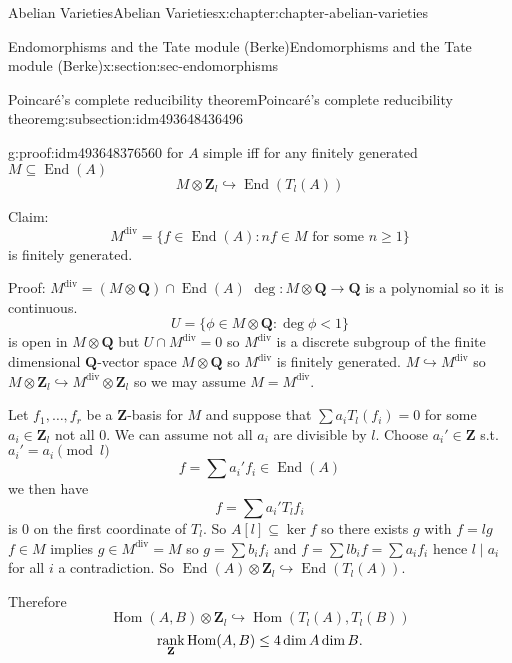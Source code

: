 \documentclass[oneside,10pt,]{book}
\newcommand{\qedhere}{\relax}
\numberwithin{equation}{section}
\newcommand{\lb}{[}
\newcommand{\rb}{]}
\newcommand{\ZZ}{\mathbf{Z}}
\newcommand{\QQ}{\mathbf{Q}}
\DeclareMathOperator{\End}{End}
\DeclareMathOperator{\Hom}{Hom}
\DeclareMathOperator{\rank}{rank}
\newcommand{\lt}{<}
\begin{document}
\begin{chapterptx}{Abelian Varieties}{}{Abelian Varieties}{}{}{x:chapter:chapter-abelian-varieties}
\begin{sectionptx}{Endomorphisms and the Tate module (Berke)}{}{Endomorphisms and the Tate module (Berke)}{}{}{x:section:sec-endomorphisms}
\begin{subsectionptx}{Poincaré's complete reducibility theorem}{}{Poincaré's complete reducibility theorem}{}{}{g:subsection:idm493648436496}
\begin{proofptx}{}{g:proof:idm493648376560}
for \(A\) simple iff for any finitely generated \(M \subseteq \End(A)\)%
\begin{equation*}
M \otimes \ZZ_l \hookrightarrow \End(T_l(A))
\end{equation*}
%
\par
Claim:%
\begin{equation*}
M^{\text{div}} = \{f\in \End(A) : nf\in M \text{ for some }n\ge 1\}
\end{equation*}
is finitely generated.%
\par
Proof: \(M^\text{div} = (M\otimes \QQ) \cap \End(A)\) \(\deg \colon M \otimes \QQ \to \QQ\) is a polynomial so it is continuous.%
\begin{equation*}
U = \{\phi\in M \otimes \QQ : \deg \phi \lt 1\}
\end{equation*}
is open in \(M \otimes \QQ\) but \(U \cap M^\text{div} = 0\) so \(M^\text{div} \) is a discrete subgroup of the finite dimensional \(\QQ\)-vector space \(M \otimes \QQ\) so \(M^\text{div}\) is finitely generated. \(M \hookrightarrow M^\text{div}\) so \(M \otimes \ZZ_l \hookrightarrow M^\text{div} \otimes \ZZ_l\) so  we may assume \(M = M^\text{div}\).%
\par
Let \(f_1,\ldots, f_r\) be a \(\ZZ\)-basis for \(M\) and suppose that \(\sum a_iT_l(f_i)=0\) for some \(a_i \in \ZZ_l\) not all 0. We can assume not all \(a_i\) are divisible by \(l\). Choose \(a_i' \in \ZZ\) s.t. \(a_i'=a_i \pmod{l}\)%
\begin{equation*}
f = \sum a_i' f_i \in \End(A)
\end{equation*}
we then have%
\begin{equation*}
f = \sum a_i' T_lf_i
\end{equation*}
is 0 on the first coordinate of \(T_l\). So \(A\lb l \rb \subseteq \ker f\) so there exists \(g\) with \(f= lg\) \(f\in M\) implies \(g\in M^\text{div} = M\) so \(g = \sum b_i f_i\) and \(f = \sum lb_i f = \sum a_i f_i\) hence \(l\mid a_i\) for all \(i\) a contradiction. So \(\End(A)\otimes \ZZ_l \hookrightarrow \End(T_l(A))\).%
\par
Therefore%
\begin{equation*}
\Hom(A,B) \otimes \ZZ_l \hookrightarrow \Hom(T_l(A), T_l(B))
\end{equation*}
%
\begin{equation*}
\rank_\ZZ \Hom(A,B) \le 4 \dim A\dim B\text{.}\qedhere
\end{equation*}
%
\end{proofptx}
\end{subsectionptx}

\end{sectionptx}
\end{chapterptx}
\end{document}
